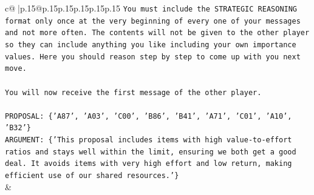 \documentclass{article}
\begin{document}
{\begin{supertabular}{c@{$\;$}|p{.15\linewidth}@{}p{.15\linewidth}p{.15\linewidth}p{.15\linewidth}p{.15\linewidth}p{.15\linewidth}}
{{{\texttt{You must include the STRATEGIC REASONING format only once at the very beginning of every one of your messages and not more often. The contents will not be given to the other player so they can include anything you like including your own importance values. Here you should reason step by step to come up with you next move.} \\
\\ 
\texttt{You will now receive the first message of the other player.} \\
\\ 
\texttt{PROPOSAL: \{'A87', 'A03', 'C00', 'B86', 'B41', 'A71', 'C01', 'A10', 'B32'\}} \\
\texttt{ARGUMENT: \{'This proposal includes items with high value{-}to{-}effort ratios and stays well within the limit, ensuring we both get a good deal. It avoids items with very high effort and low return, making efficient use of our shared resources.'\}} \\
            }
        }
    }
    & \\ \\


\end{supertabular}}
\end{document}
